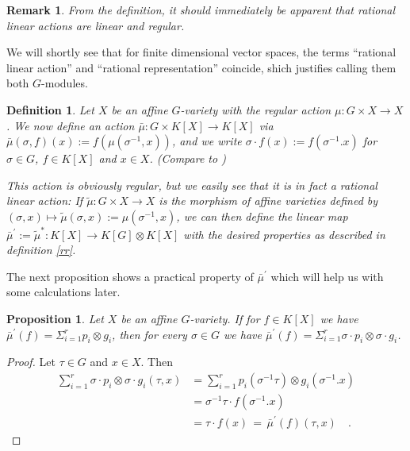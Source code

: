 \message{ !name(roughdraft.tex)}\documentclass[a4paper]{article}
\theoremstyle{prrt}
\newtheorem{definition}[theorem]{Definition}
\newtheorem{proposition}[theorem]{Proposition}
\newtheorem{remark}{Remark}[theorem]
\begin{document}
\begin{remark}
  From the definition, it should immediately be apparent that rational linear actions are linear and regular.
\end{remark}

We will shortly see that for finite dimensional vector spaces, the terms ``rational linear action'' and ``rational representation'' coincide, shich justifies calling them both $G$-modules.

\begin{definition}\label{funrep}
  Let $X$ be an affine $G$-variety with the regular action $\mu \colon G \times X \rightarrow X$.
  We now define an action $\bar{\mu} \colon G \times K[X] \rightarrow K[X]$ via $\bar{\mu}(\sigma,f)(x) := f(\mu(\sigma^{-1},x))$, and we write $\sigma\cdot f (x) := f( \sigma^{-1}.x )$ for  $\sigma \in G$, $f \in K[X]$ and $x \in X$.  (Compare to \cite[p.~31]{DK15})
  
  This action is obviously regular, but we easily see that it is in fact a rational linear action:
  If $\tilde{\mu} \colon G \times X \rightarrow X$ is the morphism of affine varieties defined by $ (\sigma,x)\mapsto\tilde{\mu} (\sigma,x) := \mu (\sigma^{-1},x)$, we can then define the linear map \linebreak$ \bar{\mu}^\prime := \tilde{\mu}^\ast \colon K[X] \rightarrow K[G] \otimes K[X]$ with the desired properties as described in definition \ref{rr}.
\end{definition}

The next proposition shows a practical property of $\bar{\mu}^\prime$ which will help us with some calculations later.
\begin{proposition}\label{rara}
  Let $X$ be an affine $G$-variety.
  If for $f \in K[X]$ we have $\bar{\mu}^\prime (f) = \Sigma_{i =1}^r p_i \otimes g_i $, then for every $\sigma \in G$ we have $\bar{\mu}^\prime (f) = \Sigma_{i=1}^r \sigma\cdot p_i \otimes \sigma\cdot g_i$.
\end{proposition}

\begin{proof}
  Let $\tau \in G$ and $x \in X$.
  Then
  \begin{equation}
    \begin{aligned}
      \sum_{i=1}^r \sigma\cdot p_i \otimes \sigma\cdot g_i (\tau,x)
      &= \sum_{i=1}^r p_i(\sigma^{-1}\tau) \otimes g_i (\sigma^{-1}.x)  \\
      &= \sigma^{-1}\tau\cdot f(\sigma^{-1}.x)  \\
      &= \tau\cdot f(x) \, = \, \bar{\mu}^\prime (f) (\tau,x) \quad .
    \end{aligned}
  \end{equation}
\end{proof}
\end{document}

